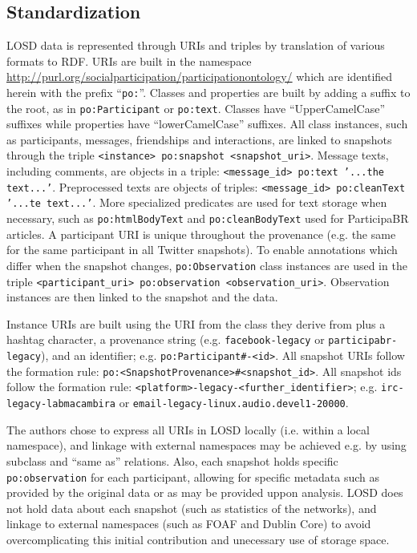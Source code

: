 \documentclass[data,datadescriptor,submit,moreauthors,pdftex]{Definitions/mdpi}
\newcommand{\textttt}[1] {\texttt{\footnotesize#1}}
\newcommand{\te}[1] {\texttt{\footnotesize#1}}
\begin{document}
\subsection{Standardization}
LOSD data is represented through URIs and triples by translation of various formats to RDF.
URIs are built in the namespace \url{http://purl.org/socialparticipation/participationontology/}
which are identified herein with the prefix ``\te{po:}''.
Classes and properties are built by adding a suffix to the root, as in \te{po:Participant} or \te{po:text}.
Classes have ``UpperCamelCase'' suffixes while properties have ``lowerCamelCase'' suffixes.
All class instances, such as participants, messages, friendships and
interactions, are linked to
snapshots through the triple \te{<instance> po:snapshot <snapshot\_uri>}.
Message texts, including comments, are objects in a triple: \te{<message\_id> po:text '...the text...'}.
Preprocessed texts are objects of triples: \te{<message\_id> po:cleanText '...te text...'}.
More specialized predicates are used for text storage when necessary,
such as \te{po:htmlBodyText} and \te{po:cleanBodyText} used
for ParticipaBR articles.
A participant URI is unique throughout the provenance (e.g. the same for
the same participant in all Twitter snapshots).
To enable annotations which differ when the snapshot changes,
\te{po:Observation} class instances are used in the triple
\te{<participant\_uri> po:observation <observation\_uri>}.
Observation instances are then linked to the snapshot and the
data.

Instance URIs are built using the URI from the class they derive from plus a hashtag character,
a provenance string (e.g. \te{facebook-legacy} or
\textttt{participabr-legacy}), and an identifier;
e.g. \textttt{po:Participant\#<provenance-legacy>-<id>}.
All snapshot URIs follow the formation rule: \textttt{po:<SnapshotProvenance>\#<snapshot\_id>}.
All snapshot ids follow the formation rule: \textttt{<platform>-legacy-<further\_identifier>}; e.g.
\textttt{irc-legacy-labmacambira} or
\textttt{email-legacy-linux.audio.devel1-20000}.

The authors chose to express all URIs in LOSD locally (i.e. within a local namespace), and linkage with external namespaces may be achieved e.g. by using subclass and ``same as'' relations.
Also, each snapshot holds specific \te{po:observation} for each participant, allowing for specific metadata such as provided by the original data or as may be provided uppon analysis.
LOSD does not hold data about each snapshot (such as statistics of the networks), and linkage to external namespaces (such as FOAF and Dublin Core)
to avoid overcomplicating this initial contribution and unecessary use of storage space.
\end{document}
